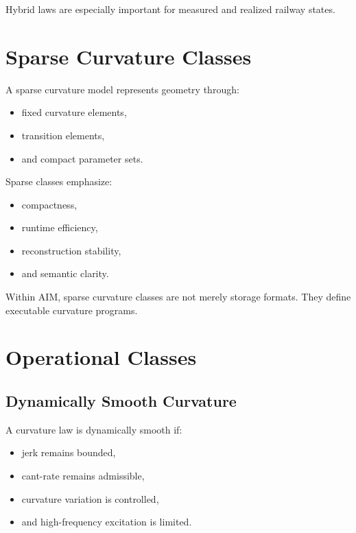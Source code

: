Hybrid laws are especially important for measured and realized railway
states.

\section{Sparse Curvature Classes}

\begin{definition}
\label{def:sparse-curvature-class}
A sparse curvature model represents geometry through:
\begin{itemize}
\item fixed curvature elements,
\item transition elements,
\item and compact parameter sets.
\end{itemize}
\end{definition}

Sparse classes emphasize:
\begin{itemize}
\item compactness,
\item runtime efficiency,
\item reconstruction stability,
\item and semantic clarity.
\end{itemize}

Within AIM, sparse curvature classes are not merely storage formats.
They define executable curvature programs.

\section{Operational Classes}

\subsection{Dynamically Smooth Curvature}

\begin{definition}
\label{def:dynamically-smooth-curvature}
A curvature law is dynamically smooth if:
\begin{itemize}
\item jerk remains bounded,
\item cant-rate remains admissible,
\item curvature variation is controlled,
\item and high-frequency excitation is limited.
\end{itemize}
\end{definition}

